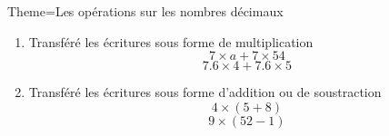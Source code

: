 \documentclass[a4paper,12pt]{article}
\begin{document}
\begin{Maquette}[Fiche]{Theme=Les opérations sur les nombres décimaux}
\begin{exercice}
\begin{enumerate}
\item Transféré les écritures sous forme de multiplication
$$7\times a +7\times 54 $$
$$7.6\times 4 +7.6\times 5 $$

\item Transféré les écritures sous forme d'addition ou de soustraction
$$4\times\left(5+8\right) $$
$$9\times\left(52-1\right) $$

\end{enumerate}
\end{exercice}
\end{Maquette}
\end{document}
